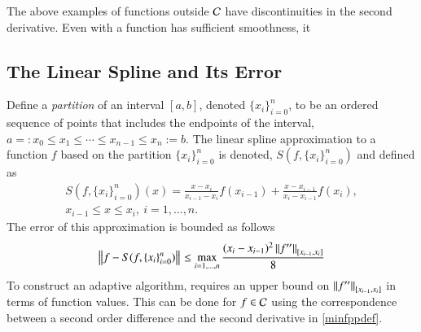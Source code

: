 \documentclass[review]{elsarticle}
\newcommand{\datasites}{\{x_i\}_{i=0}^n}
\begin{document}
The above examples of functions outside $\cc$ have discontinuities in the second derivative.  Even with a function has sufficient smoothness, it 

\subsection{The Linear Spline and Its Error}

Define a \emph{partition} of an interval $[a, b]$, denoted $\datasites$, to be an ordered sequence of points that includes the endpoints of the interval,  $a=:x_0 \le x_1 \le \cdots \le x_{n-1} \le x_{n}:=b$.   The linear spline approximation to a function $f$ based on the partition $\datasites$ is denoted, $S(f,\datasites)$ and defined as
\begin{multline} \label{splinedef}
S(f,\datasites)(x) =  \frac{x-x_i}{x_{i-1} - x_i} f(x_{i-1}) + \frac{x-x_{i-1}}{x_{i} - x_{i-1}}f(x_i), \\ x_{i-1} \le x \le x_i, \ i=1, \ldots, n.
\end{multline}
The error of this approximation is bounded as follows
\begin{equation} \label{appxerrbda}
\norm{f - S(f,\datasites)} \le \max_{i=1, \ldots, n} \frac{(x_i - x_{i-1})^2\norm[{[x_{i-1},x_i]}]{f''}}{8}
\end{equation}
To construct an adaptive algorithm, requires an upper bound on $\norm[{[x_{i-1},x_i]}]{f''}$ in terms of function values.  This can be done for $f \in \cc$ using the correspondence between a second order difference and the second derivative in \eqref{minfppdef}.
\end{document}
